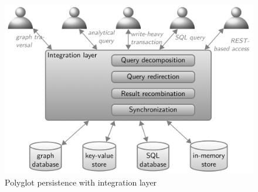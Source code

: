 \begin{figure}[!h]
        \centering
        \includegraphics[width=0.7\linewidth]{images/AdvancedDataManagment/polyglot_database_architectures/polygot_pers.jpeg}
        \caption{Polyglot persistence with integration layer}
    \end{figure}


